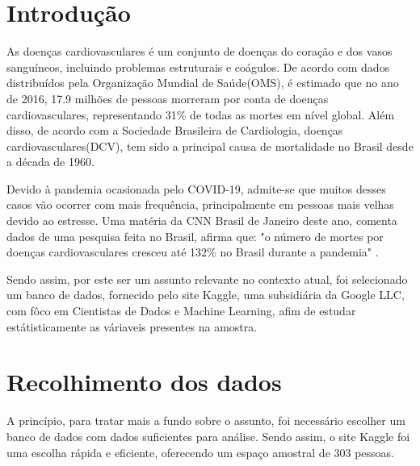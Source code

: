 \chapter*[Introdução]{Introdução}


    As doenças cardiovasculares é um conjunto de doenças do coração e dos vasos sanguíneos, incluindo 
    problemas estruturais e coágulos. De acordo com dados distribuídos pela Organização Mundial de Saúde(OMS), é estimado que no ano de 2016, 
    17.9 milhões de pessoas morreram por conta de doenças cardiovasculares, representando 31\% 
    de todas as mortes em nível global. Além disso, de acordo com a Sociedade Brasileira de Cardiologia, doenças cardiovasculares(DCV), tem sido a principal causa 
    de mortalidade no Brasil desde a década de 1960.

    Devido à pandemia ocasionada pelo COVID-19, admite-se que muitos desses casos vão ocorrer
    com mais frequência, principalmente em pessoas mais velhas devido ao estresse. Uma matéria da 
    CNN Brasil de Janeiro deste ano, comenta dados de uma pesquisa feita no Brasil, afirma 
    que: "o número de mortes por doenças cardiovasculares cresceu até 132\% no Brasil durante a pandemia"
    \cite{abccardiol}.

    Sendo assim, por este ser um assunto relevante no contexto atual, foi selecionado um banco de 
    dados, fornecido pelo site Kaggle, uma subsidiária da Google LLC, com fôco em Cientistas 
    de Dados e Machine Learning, afim de estudar estátisticamente as váriaveis presentes na amostra.

    \newpage
    \chapter{Recolhimento dos dados}

    A princípio, para tratar mais a fundo sobre o assunto, foi necessário escolher um banco 
    de dados com dados suficientes para análise. Sendo assim, o site Kaggle foi uma escolha
    rápida e eficiente, oferecendo um espaço amostral de 303 pessoas. 

    \nocite{bancodedados}
    \nocite{oms}

    \newpage